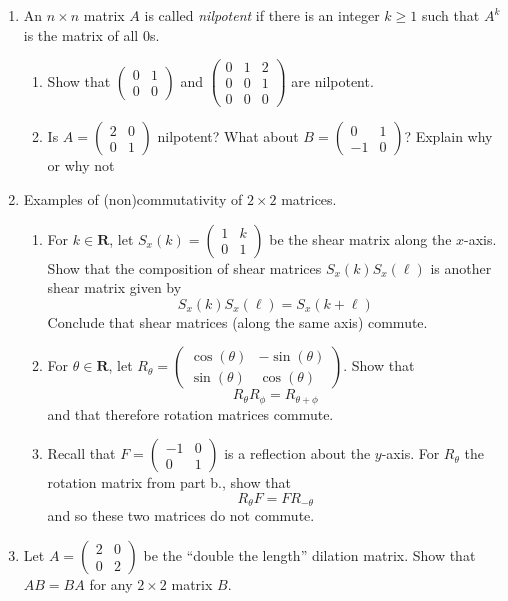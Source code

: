 \documentclass[12pt]{article}
\numberwithin{equation}{subsection}
\numberwithin{figure}{subsection}
\theoremstyle{note}
\begin{document}
\begin{enumerate}[label=\arabic*.]
	\item An $n\times n$ matrix $A$ is called \textit{nilpotent} if there is an integer $k\geq 1$ such that $A^k$ is the matrix of all $0$s. 
	\begin{enumerate}
		\item Show that $\begin{pmatrix} 0 & 1 \\ 0 & 0\end{pmatrix}$ and $\begin{pmatrix} 0 & 1 & 2 \\ 0 & 0 & 1 \\ 0 & 0 & 0\end{pmatrix}$ are nilpotent.
		\item Is $A=\begin{pmatrix} 2 & 0 \\ 0 & 1 \end{pmatrix}$ nilpotent? What about $B=\begin{pmatrix} 0 & 1 \\ -1 & 0 \end{pmatrix}$? Explain why or why not
	\end{enumerate} 
	
	\item Examples of (non)commutativity of $2\times 2$ matrices. 
	\begin{enumerate}
	\item For $k\in\mathbf{R}$, let $S_x(k)=\begin{pmatrix} 1 & k \\ 0 & 1\end{pmatrix}$ be the shear matrix along the $x$-axis. Show that the composition of shear matrices $S_x(k)S_x(\ell)$ is another shear matrix given by \[S_x(k)S_x(\ell)=S_x(k+\ell)\] Conclude that shear matrices (along the same axis) commute.
	\item For $\theta \in \mathbf{R}$, let  $R_{\theta}=\begin{pmatrix} \cos(\theta) & -\sin(\theta) \\ \sin(\theta) & \cos(\theta)\end{pmatrix}$. Show that \[ R_{\theta}R_{\phi}=R_{\theta+\phi}\]
	and that therefore rotation matrices commute. 
	\item Recall that $F=\begin{pmatrix} -1 & 0 \\ 0 & 1 \end{pmatrix}$ is a reflection about the $y$-axis. For $R_{\theta}$ the rotation matrix from part b., show that \[R_{\theta}F=FR_{-\theta}\] and so these two matrices do not commute. 
	\end{enumerate} 
	\item Let $A=\begin{pmatrix} 2 & 0 \\ 0 & 2 \end{pmatrix}$ be the ``double the length'' dilation matrix. Show that $AB=BA$ for any $2\times 2$ matrix $B$. 
	

\end{enumerate}
\end{document}
